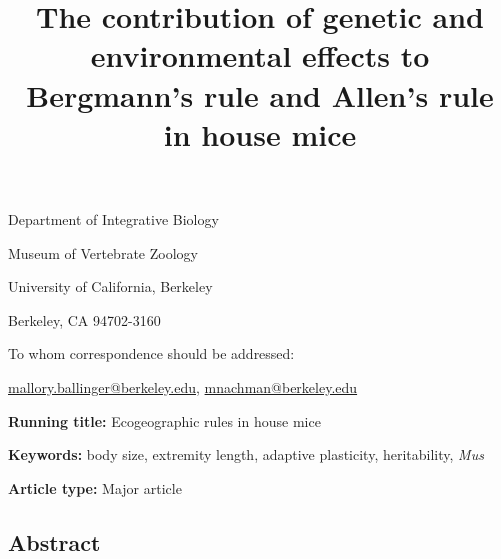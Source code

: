 \documentclass[
]{article}
\title{\LARGE

The contribution of genetic and environmental effects to Bergmann's rule
and Allen's rule in house mice}
\subtitle{\vspace{10mm}\large

Mallory A. Ballinger and Michael W. Nachman}
\author{}
\date{\vspace{-2.5em}}
\begin{document}
\maketitle

\vspace{-10mm}

\noindent Department of Integrative Biology

\noindent Museum of Vertebrate Zoology

\noindent University of California, Berkeley

\noindent Berkeley, CA 94702-3160

\vspace{5mm}

\noindent To whom correspondence should be addressed:

\noindent\href{mailto:mallory.ballinger@berkeley.edu}{mallory.ballinger@berkeley.edu},
\noindent\href{mailto:mnachman@berkeley.edu}{mnachman@berkeley.edu}

\vspace{10mm}

\noindent\textbf{Running title:} Ecogeographic rules in house mice

\noindent\textbf{Keywords:} body size, extremity length, adaptive
plasticity, heritability, \emph{Mus}

\noindent\textbf{Article type:} Major article

\newpage

\hypertarget{abstract}{%
\subsection{Abstract}\label{abstract}}
\end{document}
